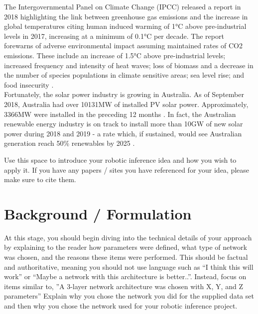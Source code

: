 \documentclass[10pt,journal,compsoc]{IEEEtran}
\begin{document}
		The Intergovernmental Panel on Climate Change (IPCC) released a report in 2018 highlighting the link between greenhouse gas emissions and the increase in global temperatures citing human induced warming of 1$\si{\celsius}$ above pre-industrial levels in 2017, increasing at a minimum of 0.1$ \si{\celsius}$ per decade. The report forewarns of adverse environmental impact assuming maintained rates of CO2 emissions. These include an increase of 1.5$ \si{\celsius}$ above pre-industrial levels; increased frequency and intensity of heat waves; loss of biomass and a decrease in the number of species populations in climate sensitive areas; sea level rise; and food insecurity \cite{IPCC:2018}.\\ 
		
		Fortunately, the solar power industry is growing in Australia. As of September 2018, Australia had over 10131$\si{\mega\watt}$ of installed PV solar power. Approximately, 3366$\si{\mega\watt}$ were installed in the preceding 12 months \cite{APVI:2018}. In fact, the Australian renewable energy industry is on track to install more than 10$\si{\giga\watt}$ of new solar power during 2018 and 2019 - a rate which, if sustained, would see Australian generation reach 50\% renewables by 2025 \cite{Baldwin:2018}.
		
		
		Use this space to introduce your robotic inference idea and how you wish to apply it. 
		If you have any papers / sites you have referenced for your idea, please make sure to cite them.
		
		
		
		
		
		
		
		
		
		\section{Background / Formulation}
		At this stage, you should begin diving into the technical details of your approach by explaining to the reader how parameters were defined, what type of network was chosen, and the reasons these items were performed. This should be factual and authoritative, meaning you should not use language such as “I think this will work” or “Maybe a network with this architecture is better..”. Instead, focus on items similar to, ”A 3-layer network architecture was chosen with X, Y, and Z parameters” 
		Explain why you chose the network you did for the supplied data set and then why you chose the network used for your robotic inference project.
		
\end{document}

